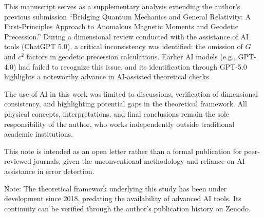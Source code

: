 \documentclass[%
 reprint,
 amsmath,amssymb,
 aps,
]{revtex4-1}
\numberwithin{equation}{section}
\begin{document}
This manuscript serves as a supplementary analysis extending the author's previous submission ``Bridging Quantum Mechanics and General Relativity: A First-Principles Approach to Anomalous Magnetic Moments and Geodetic Precession.'' During a dimensional review conducted with the assistance of AI tools (ChatGPT 5.0), a critical inconsistency was identified: the omission of $G$ and $c^2$ factors in geodetic precession calculations. Earlier AI models (e.g., GPT-4.0) had failed to recognize this issue, and its identification through GPT-5.0 highlights a noteworthy advance in AI-assisted theoretical checks. 

The use of AI in this work was limited to discussions, verification of dimensional consistency, and highlighting potential gaps in the theoretical framework. All physical concepts, interpretations, and final conclusions remain the sole responsibility of the author, who works independently outside traditional academic institutions. 

This note is intended as an open letter rather than a formal publication for peer-reviewed journals, given the unconventional methodology and reliance on AI assistance in error detection. 

\medskip
\noindent
Note: The theoretical framework underlying this study has been under development since 2018, predating the availability of advanced AI tools. Its continuity can be verified through the author's publication history on Zenodo.

\end{document}
